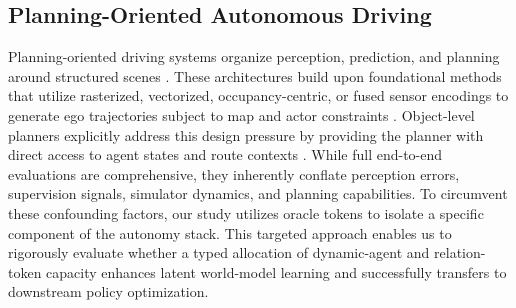 \documentclass[10pt,journal,compsoc]{IEEEtran}
\begin{document}

\subsection{Planning-Oriented Autonomous Driving}
Planning-oriented driving systems organize perception, prediction, and planning around structured scenes \cite{hu2022stp3,hu2023uniad,jiang2023vad}. These architectures build upon foundational methods that utilize rasterized, vectorized, occupancy-centric, or fused sensor encodings to generate ego trajectories subject to map and actor constraints \cite{zeng2019end,casas2021mp3,philion2020lift,transfuser2021,sadat2020perceive}. Object-level planners explicitly address this design pressure by providing the planner with direct access to agent states and route contexts \cite{renz2022plant}. While full end-to-end evaluations are comprehensive, they inherently conflate perception errors, supervision signals, simulator dynamics, and planning capabilities. To circumvent these confounding factors, our study utilizes oracle tokens to isolate a specific component of the autonomy stack. This targeted approach enables us to rigorously evaluate whether a typed allocation of dynamic-agent and relation-token capacity enhances latent world-model learning and successfully transfers to downstream policy optimization.
\end{document}
